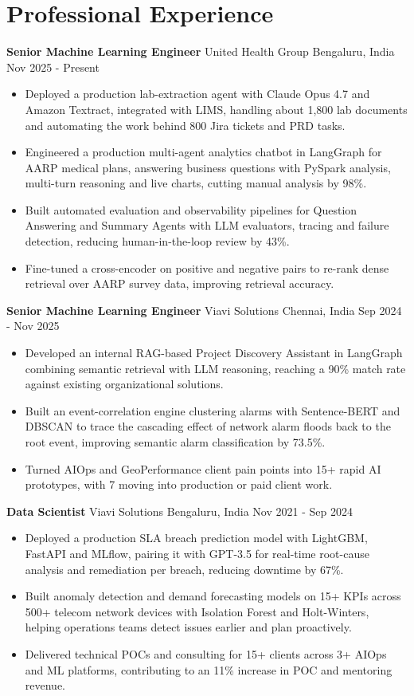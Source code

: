 \documentclass[10pt,a4paper]{article}
\newcommand{\role}[4]{\textbf{#1} \textbar{} #2 \hfill #3 \textbar{} #4\par}
\begin{document}
\section{Professional Experience}
\role{Senior Machine Learning Engineer}{United Health Group}{Bengaluru, India}{Nov 2025 - Present}
\begin{itemize}
  \item Deployed a production lab-extraction agent with Claude Opus 4.7 and Amazon Textract, integrated with LIMS, handling about 1,800 lab documents and automating the work behind 800 Jira tickets and PRD tasks.
  \item Engineered a production multi-agent analytics chatbot in LangGraph for AARP medical plans, answering business questions with PySpark analysis, multi-turn reasoning and live charts, cutting manual analysis by 98\%.
  \item Built automated evaluation and observability pipelines for Question Answering and Summary Agents with LLM evaluators, tracing and failure detection, reducing human-in-the-loop review by 43\%.
  \item Fine-tuned a cross-encoder on positive and negative pairs to re-rank dense retrieval over AARP survey data, improving retrieval accuracy.
\end{itemize}
\vspace{3pt}
\role{Senior Machine Learning Engineer}{Viavi Solutions}{Chennai, India}{Sep 2024 - Nov 2025}
\begin{itemize}
  \item Developed an internal RAG-based Project Discovery Assistant in LangGraph combining semantic retrieval with LLM reasoning, reaching a 90\% match rate against existing organizational solutions.
  \item Built an event-correlation engine clustering alarms with Sentence-BERT and DBSCAN to trace the cascading effect of network alarm floods back to the root event, improving semantic alarm classification by 73.5\%.
  \item Turned AIOps and GeoPerformance client pain points into 15+ rapid AI prototypes, with 7 moving into production or paid client work.
\end{itemize}
\vspace{3pt}
\role{Data Scientist}{Viavi Solutions}{Bengaluru, India}{Nov 2021 - Sep 2024}
\begin{itemize}
  \item Deployed a production SLA breach prediction model with LightGBM, FastAPI and MLflow, pairing it with GPT-3.5 for real-time root-cause analysis and remediation per breach, reducing downtime by 67\%.
  \item Built anomaly detection and demand forecasting models on 15+ KPIs across 500+ telecom network devices with Isolation Forest and Holt-Winters, helping operations teams detect issues earlier and plan proactively.
  \item Delivered technical POCs and consulting for 15+ clients across 3+ AIOps and ML platforms, contributing to an 11\% increase in POC and mentoring revenue.
\end{itemize}
\end{document}

